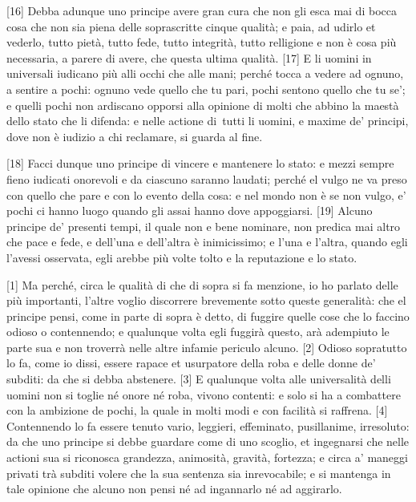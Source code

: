{[}16{]} Debba adunque uno principe avere gran cura che non gli esca mai
di bocca cosa che non sia piena delle soprascritte cinque qualità; e
paia, ad udirlo et vederlo, tutto pietà, tutto fede, tutto integrità,
tutto relligione e non è cosa più necessaria, a parere di avere, che
questa ultima qualità. {[}17{]} E li uomini in universali iudicano più
alli occhi che alle mani; perché tocca a vedere ad ognuno, a sentire a
pochi: ognuno vede quello che tu pari, pochi sentono quello che tu se';
e quelli pochi non ardiscano opporsi alla opinione di molti che abbino
la maestà dello stato che li difenda: e nelle actione di\est\ tutti li
uomini, e maxime de' principi, dove non è iudizio a chi reclamare, si
guarda al fine.

{[}18{]} Facci dunque uno principe di vincere e mantenere lo stato: e
mezzi sempre fieno iudicati onorevoli e da ciascuno saranno laudati;
perché el vulgo ne va preso con quello che pare e con lo evento della
cosa: e nel mondo non è se non vulgo, e' pochi ci hanno luogo quando gli
assai hanno dove appoggiarsi. {[}19{]} Alcuno principe de' presenti
tempi, il quale non e bene nominare, non predica mai altro che pace e
fede, e dell'una e dell'altra è inimicissimo; e l'una e l'altra, quando
egli l'avessi osservata, egli arebbe più volte tolto e la reputazione e
lo stato.


{[}1{]} Ma perché, circa le qualità di che di sopra si fa menzione, io
ho parlato delle più importanti, l'altre voglio discorrere brevemente
sotto queste generalità: che el principe pensi, come in parte di sopra è
detto, di fuggire quelle cose che lo faccino odioso o contennendo; e
qualunque volta egli fuggirà questo, arà adempiuto le parte sua e non
troverrà nelle altre infamie periculo alcuno. {[}2{]} Odioso sopratutto
lo fa, come io dissi, essere rapace et usurpatore della roba e delle
donne de' subditi: da che si debba abstenere. {[}3{]} E qualunque volta
alle universalità delli uomini non si toglie né onore né roba, vivono
contenti: e solo si ha a combattere con la ambizione de pochi, la quale
in molti modi e con facilità si raffrena. {[}4{]} Contennendo lo fa
essere tenuto vario, leggieri, effeminato, pusillanime, irresoluto: da
che uno principe si debbe guardare come di uno scoglio, et ingegnarsi
che nelle actioni sua si riconosca grandezza, animosità, gravità,
fortezza; e circa a' maneggi privati trà subditi volere che la sua
sentenza sia inrevocabile; e si mantenga in tale opinione che alcuno non
pensi né ad ingannarlo né ad aggirarlo.

